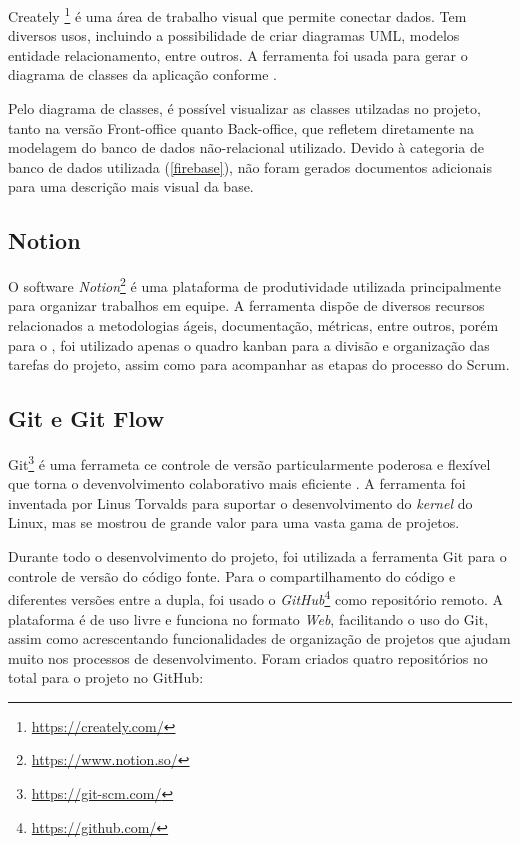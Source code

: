 Creately \footnote{\url{https://creately.com/}} é uma área de trabalho visual que permite conectar dados. Tem diversos usos, incluindo a possibilidade de criar diagramas UML, modelos entidade relacionamento, entre outros. A ferramenta foi usada para gerar o diagrama de classes da aplicação conforme .


Pelo diagrama de classes, é possível visualizar as classes utilzadas no projeto, tanto na versão Front-office quanto Back-office, que refletem diretamente na modelagem do banco de dados não-relacional utilizado. Devido à categoria de banco de dados utilizada (\ref{firebase}), não foram gerados documentos adicionais para uma descrição mais visual da base.

\subsection{Notion}

O software \textit{Notion}\footnote{\url{https://www.notion.so/}} é uma plataforma de produtividade utilizada principalmente para organizar trabalhos em equipe. A ferramenta dispõe de diversos recursos relacionados a metodologias ágeis, documentação, métricas, entre outros, porém para o \appName, foi utilizado apenas o quadro kanban para a divisão e organização das tarefas do projeto, assim como para acompanhar as etapas do processo do Scrum.

\subsection{Git e Git Flow}
\label{git}

Git\footnote{\url{https://git-scm.com/}} é uma ferrameta ce controle de versão particularmente poderosa e flexível que torna o devenvolvimento colaborativo mais eficiente \cite{git}. A ferramenta foi inventada por Linus Torvalds para suportar o desenvolvimento do \textit{kernel} do Linux, mas se mostrou de grande valor para uma vasta gama de projetos.

Durante todo o desenvolvimento do projeto, foi utilizada a ferramenta Git para o controle de versão do código fonte. Para o compartilhamento do código e diferentes versões entre a dupla, foi usado o \textit{GitHub}\footnote{\url{https://github.com/}} como repositório remoto. A plataforma é de uso livre e funciona no formato \textit{Web}, facilitando o uso do Git, assim como acrescentando funcionalidades de organização de projetos que ajudam muito nos processos de desenvolvimento. Foram criados quatro repositórios no total para o projeto no GitHub:

